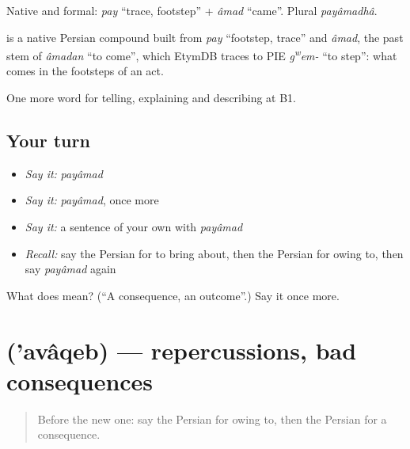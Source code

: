Native and formal: \emph{pay} \textquotedblleft{}trace, footstep\textquotedblright{} + \emph{âmad} \textquotedblleft{}came\textquotedblright{}. Plural \emph{payâmadhâ}.

\begin{cousinweb}
\textbf{} is a native Persian compound built from \emph{pay} \textquotedblleft{}footstep, trace\textquotedblright{} and \emph{âmad}, the past stem of \emph{âmadan} \textquotedblleft{}to come\textquotedblright{}, which EtymDB traces to PIE \emph{g\textsuperscript{w}em-} \textquotedblleft{}to step\textquotedblright{}: what comes in the footsteps of an act.
\end{cousinweb}

\begin{grammarlens}[title={What you've built}]
One more word for telling, explaining and describing at B1.
\end{grammarlens}

\subsection*{Your turn}
\begin{itemize}
\raggedright
  \item \emph{Say it:} \emph{payâmad}
  \item \emph{Say it:} \emph{payâmad}, once more
  \item \emph{Say it:} a sentence of your own with \emph{payâmad}
  \item \emph{Recall:} say the Persian for to bring about, then the Persian for owing to, then say \emph{payâmad} again
\end{itemize}

\begin{tcolorbox}[breakable,colback=teal!4,colframe=teal!35!black,title={Before you move on}]
What does  mean? (\textquotedblleft{}A consequence, an outcome\textquotedblright{}.) Say it once more.
\end{tcolorbox}
\section[\texorpdfstring{\fa{عواقب} ('avâqeb)}{عواقب ('avâqeb)}]{ ('avâqeb) — repercussions, bad consequences}

\label{lesson:FA-C370-avaqeb}



\begin{quote}
Before the new one: say the Persian for owing to, then the Persian for a consequence.
\end{quote}

